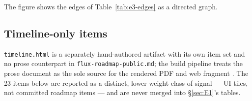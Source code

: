 The figure shows the edges of Table~\ref{tab:e3-edges} as a directed graph.


\subsection{Timeline-only items}\label{sec:E4}

\texttt{timeline.html} is a separately hand-authored artifact with its own item set and no prose
counterpart in \texttt{flux-roadmap-public.\allowbreak{}md}; the build pipeline treats the prose document as
the sole source for the rendered PDF and web fragment
. The 23 items below are reported as a distinct,
lower-weight class of signal — UI tiles, not committed roadmap items — and are never merged into
\S\ref{sec:E1}'s tables.

